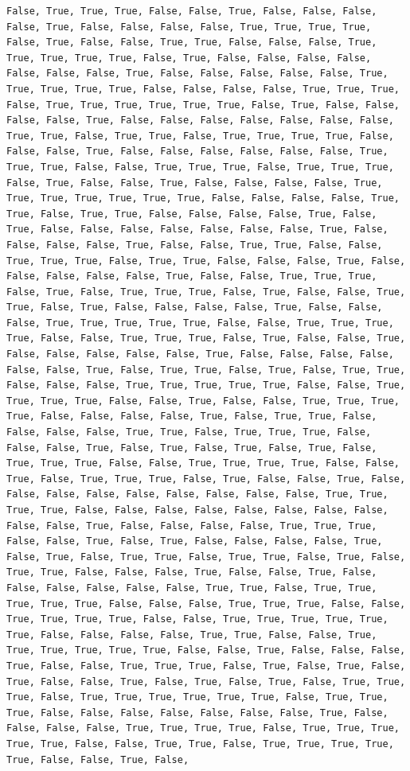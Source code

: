 \documentclass[
  letterpaper,
  DIV=11,
  numbers=noendperiod]{scrartcl}
\begin{document}
\begin{verbatim}
False, True, True, True, False, False, True, False, False, False, False, True, False, False, False, False, True, True, True, True, False, True, False, False, True, True, False, False, False, True, True, True, True, True, False, True, False, False, False, False, False, False, False, True, False, False, False, False, False, True, True, True, True, True, False, False, False, False, True, True, True, False, True, True, True, True, True, True, False, True, False, False, False, False, True, False, False, False, False, False, False, False, True, True, False, True, True, False, True, True, True, True, False, False, False, True, False, False, False, False, False, False, True, True, True, False, False, True, True, True, False, True, True, True, False, True, False, False, True, False, False, False, False, True, True, True, True, True, True, True, False, False, False, False, True, True, False, True, True, False, False, False, False, True, False, True, False, False, False, False, False, False, False, True, False, False, False, False, True, False, False, True, True, False, False, True, True, True, False, True, True, False, False, False, True, False, False, False, False, False, True, False, False, True, True, True, False, True, False, True, True, True, False, True, False, False, True, True, False, True, False, False, False, False, True, False, False, False, True, True, True, True, True, False, False, True, True, True, True, False, False, True, True, True, False, True, False, False, True, False, False, False, False, False, True, False, False, False, False, False, False, True, False, True, True, False, True, False, True, True, False, False, False, True, True, True, True, True, False, False, True, True, True, True, False, False, True, False, False, True, True, True, True, False, False, False, False, True, False, True, True, False, False, False, False, True, True, False, True, True, True, False, False, False, True, False, True, False, True, False, True, False, True, True, True, False, False, True, True, True, True, False, False, True, False, True, True, True, False, True, False, False, True, False, False, False, False, False, False, False, False, False, True, True, True, True, False, False, False, False, False, False, False, False, False, False, True, False, False, False, False, True, True, True, False, False, True, False, True, False, False, False, False, True, False, True, False, True, True, False, True, True, False, True, False, True, True, False, False, False, True, False, False, True, False, False, False, False, False, False, True, True, False, True, True, True, True, True, False, False, False, True, True, True, False, False, True, True, True, True, False, False, True, True, True, True, True, True, False, False, False, False, True, True, False, False, True, True, True, True, True, True, False, False, True, False, False, False, True, False, False, True, True, True, False, True, False, True, False, True, False, False, True, False, True, False, True, False, True, True, True, False, True, True, True, True, True, True, False, True, True, True, False, False, False, False, False, False, False, True, False, False, False, False, True, True, True, True, False, True, True, True, True, True, False, False, True, True, False, True, True, True, True, True, False, False, True, False, 
\end{verbatim}
\end{document}
